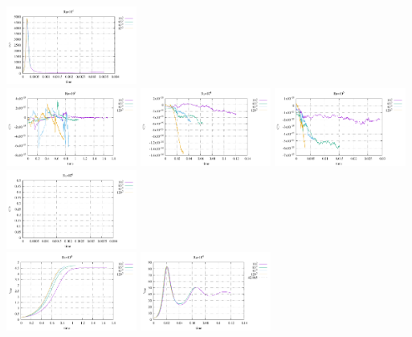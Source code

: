 \begin{center}
\includegraphics[width=4.297cm]{python_codes/fieldstone_155/results/avrg_v_Ra1e6}\\
\includegraphics[width=4.297cm]{python_codes/fieldstone_155/results/avrg_T_Ra1e3}
\includegraphics[width=4.297cm]{python_codes/fieldstone_155/results/avrg_T_Ra1e4}
\includegraphics[width=4.297cm]{python_codes/fieldstone_155/results/avrg_T_Ra1e5}
\includegraphics[width=4.297cm]{python_codes/fieldstone_155/results/avrg_T_Ra1e6}
\\
\includegraphics[width=4.297cm]{python_codes/fieldstone_155/results/vrms_Ra1e3}
\includegraphics[width=4.297cm]{python_codes/fieldstone_155/results/vrms_Ra1e4}

\end{center}
